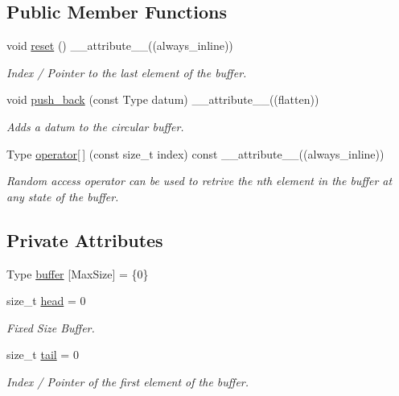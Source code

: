 \subsection*{Public Member Functions}
\begin{DoxyCompactItemize}
\item 
void \hyperlink{classSimpler__Circular__Buffer_a793cdb8134afe48ef9918fa0428dfbb6}{reset} () \+\_\+\+\_\+attribute\+\_\+\+\_\+((always\+\_\+inline))
\begin{DoxyCompactList}\small\item\em Index / Pointer to the last element of the buffer. \end{DoxyCompactList}\item 
void \hyperlink{classSimpler__Circular__Buffer_af4bdd0a6d3fc7a8c06f62b0d996158f0}{push\+\_\+back} (const Type datum) \+\_\+\+\_\+attribute\+\_\+\+\_\+((flatten))
\begin{DoxyCompactList}\small\item\em Adds a datum to the circular buffer. \end{DoxyCompactList}\item 
Type \hyperlink{classSimpler__Circular__Buffer_a4ce53bc8ad0d231e9d013c771191696a}{operator\mbox{[}$\,$\mbox{]}} (const size\+\_\+t index) const \+\_\+\+\_\+attribute\+\_\+\+\_\+((always\+\_\+inline))
\begin{DoxyCompactList}\small\item\em Random access operator can be used to retrive the nth element in the buffer at any state of the buffer. \end{DoxyCompactList}\end{DoxyCompactItemize}
\subsection*{Private Attributes}
\begin{DoxyCompactItemize}
\item 
Type \hyperlink{classSimpler__Circular__Buffer_a05808047d226985470e02e84b44bee9a}{buffer} \mbox{[}Max\+Size\mbox{]} = \{0\}
\item 
size\+\_\+t \hyperlink{classSimpler__Circular__Buffer_aa6fea0e7b9d4b57aa825dfe11aec3c25}{head} = 0
\begin{DoxyCompactList}\small\item\em Fixed Size Buffer. \end{DoxyCompactList}\item 
size\+\_\+t \hyperlink{classSimpler__Circular__Buffer_a2833e67d4d6cfae68e71306037015642}{tail} = 0
\begin{DoxyCompactList}\small\item\em Index / Pointer of the first element of the buffer. \end{DoxyCompactList}\end{DoxyCompactItemize}


